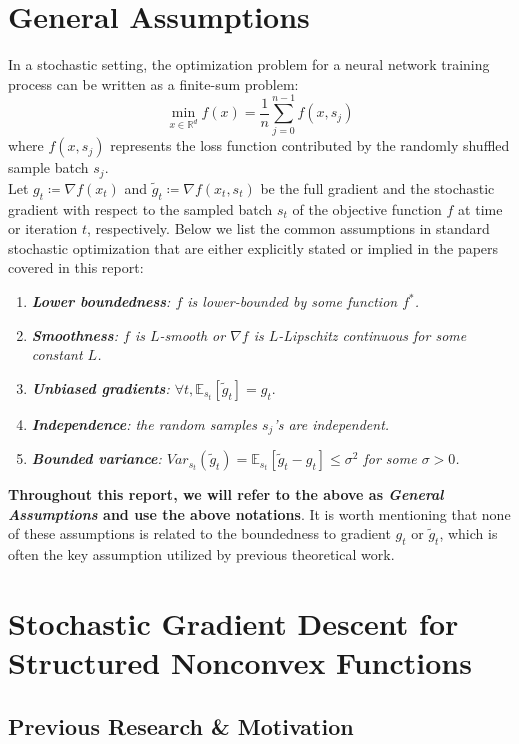 \documentclass{article}
\begin{document}
\section{General Assumptions}
In a stochastic setting, the optimization problem for a neural network training process can be written as a finite-sum problem:
\[
\min_{x \in \mathbb{R}^d} f(x) = \frac{1}{n}\sum_{j = 0}^{n - 1} f(x, s_j)
\]
where $f(x, s_j)$ represents the loss function contributed by the randomly shuffled sample batch $s_j$.\\
\newline
Let $g_t\coloneqq\nabla f(x_t)$ and $\tilde{g}_t \coloneqq  \nabla f(x_t, s_t)$ be the full gradient and the stochastic gradient with respect to the sampled batch $s_t$ of the objective function $f$ at time or iteration $t$, respectively. Below we list the common assumptions in standard stochastic optimization that are either explicitly stated or implied in the papers covered in this report:
\begin{enumerate}[leftmargin=*]
	\item \textit{\textbf{Lower boundedness}: $f$ is lower-bounded by some function $f^*$.}
	\item \textit{\textbf{Smoothness}: $f$ is $L$-smooth or $\nabla f$ is $L$-Lipschitz continuous for some constant $L$.}
	\item \textit{\textbf{Unbiased gradients}: $\forall t, \mathbb{E}_{s_t}[\tilde{g}_t] = g_t$}.
	\item \textit{\textbf{Independence}: the random samples $s_j$'s are independent.}
	\item \textit{\textbf{Bounded variance}: $Var_{s_t}(\tilde{g}_t) = \mathbb{E}_{s_t}[\tilde{g}_t - g_t] \leq \sigma^2$ for some $\sigma > 0$.}
\end{enumerate}
\textbf{Throughout this report, we will refer to the above as \textit{General Assumptions} and use the above notations}.
It is worth mentioning that none of these assumptions is related to the boundedness to gradient $g_t$ or $\tilde{g}_t$, which is often the key assumption utilized by previous theoretical work.
\section{Stochastic Gradient Descent for Structured Nonconvex Functions}
\label{section3}
\subsection{Previous Research \& Motivation}
\end{document}

